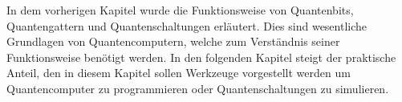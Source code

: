 In dem vorherigen Kapitel wurde die Funktionsweise von Quantenbits, Quantengattern und Quantenschaltungen erl\"autert. Dies sind wesentliche Grundlagen von Quantencomputern, welche zum Verst\"andnis seiner Funktionsweise ben\"otigt werden. In den folgenden Kapitel steigt der praktische Anteil, den in diesem Kapitel sollen Werkzeuge vorgestellt werden um Quantencomputer zu programmieren oder Quantenschaltungen zu simulieren.
